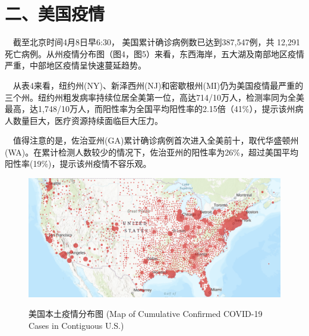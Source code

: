 \documentclass[
]{article}
\begin{document}
\newpage

\hypertarget{section-3}{%
\section{\texorpdfstring{\textcolor{glaucous}{二、美国疫情}}{}}\label{section-3}}

\(\quad\)截至北京时间4月8日早6:30，
美国累计确诊病例数已达到387,547例，共 12,291
死亡病例。从州疫情分布图（图4，图5）来看，东西海岸，五大湖及南部地区疫情严重，中部地区疫情呈快速蔓延趋势。

\(\quad\)从表4来看，纽约州(NY)、新泽西州(NJ)和密歇根州(MI)仍为美国疫情最严重的三个州。纽约州粗发病率持续位居全美第一位，高达714/10万人，检测率同为全美最高，达1,748/10万人，而阳性率为全国平均阳性率的2.15倍（41\%），提示该州病人数量巨大，医疗资源持续面临巨大压力。

\(\quad\)值得注意的是，佐治亚州(GA)累计确诊病例首次进入全美前十，取代华盛顿州(WA)。在累计检测人数较少的情况下，佐治亚州的阳性率为26\%，超过美国平均阳性率(19\%)，提示该州疫情不容乐观。

\begin{figure}[H] 
\caption{美国本土疫情分布图 (Map of Cumulative Confirmed COVID-19 Cases in Contiguous U.S.)} %
\centering
\includegraphics[]{./input/covid4.png} %
\label{} %
\end{figure}
\end{document}
